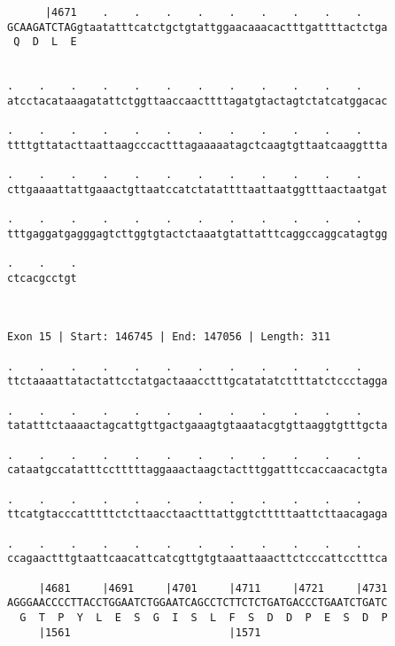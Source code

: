 \documentclass{article}
\begin{document}
\begin{Verbatim}
      |4671    .    .    .    .    .    .    .    .    .    
GCAAGATCTAGgtaatatttcatctgctgtattggaacaaacactttgattttactctga
 Q  D  L  E                                                 
                                                            
  
.    .    .    .    .    .    .    .    .    .    .    .    
atcctacataaagatattctggttaaccaacttttagatgtactagtctatcatggacac
                                                            
.    .    .    .    .    .    .    .    .    .    .    .    
ttttgttatacttaattaagcccactttagaaaaatagctcaagtgttaatcaaggttta
                                                            
.    .    .    .    .    .    .    .    .    .    .    .    
cttgaaaattattgaaactgttaatccatctatattttaattaatggtttaactaatgat
                                                            
.    .    .    .    .    .    .    .    .    .    .    .    
tttgaggatgagggagtcttggtgtactctaaatgtattatttcaggccaggcatagtgg
                                                            
.    .    .
ctcacgcctgt
           
           
 
Exon 15 | Start: 146745 | End: 147056 | Length: 311
 
.    .    .    .    .    .    .    .    .    .    .    .    
ttctaaaattatactattcctatgactaaacctttgcatatatcttttatctccctagga
                                                            
.    .    .    .    .    .    .    .    .    .    .    .    
tatatttctaaaactagcattgttgactgaaagtgtaaatacgtgttaaggtgtttgcta
                                                            
.    .    .    .    .    .    .    .    .    .    .    .    
cataatgccatatttcctttttaggaaactaagctactttggatttccaccaacactgta
                                                            
.    .    .    .    .    .    .    .    .    .    .    .    
ttcatgtacccatttttctcttaacctaactttattggtctttttaattcttaacagaga
                                                            
.    .    .    .    .    .    .    .    .    .    .    .    
ccagaactttgtaattcaacattcatcgttgtgtaaattaaacttctcccattcctttca
                                                            
     |4681     |4691     |4701     |4711     |4721     |4731
AGGGAACCCCTTACCTGGAATCTGGAATCAGCCTCTTCTCTGATGACCCTGAATCTGATC
  G  T  P  Y  L  E  S  G  I  S  L  F  S  D  D  P  E  S  D  P
     |1561                         |1571                    
  

\end{Verbatim}
\end{document}

